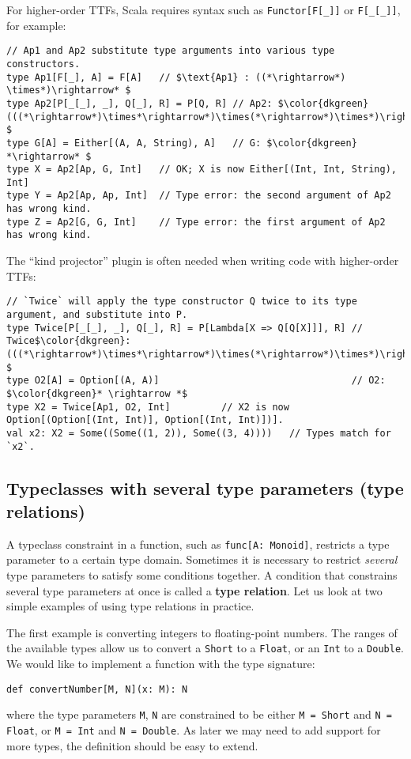 For higher-order TTFs, Scala requires syntax such as \lstinline!Functor[F[_]]!
or \lstinline!F[_[_]]!, for example:
\begin{lstlisting}[mathescape=true]
// Ap1 and Ap2 substitute type arguments into various type constructors.
type Ap1[F[_], A] = F[A]   // $\text{Ap1} : ((*\rightarrow*) \times*)\rightarrow* $
type Ap2[P[_[_], _], Q[_], R] = P[Q, R] // Ap2: $\color{dkgreen}(((*\rightarrow*)\times*\rightarrow*)\times(*\rightarrow*)\times*)\rightarrow* $
type G[A] = Either[(A, A, String), A]   // G: $\color{dkgreen} *\rightarrow* $
type X = Ap2[Ap, G, Int]   // OK; X is now Either[(Int, Int, String), Int]
type Y = Ap2[Ap, Ap, Int]  // Type error: the second argument of Ap2 has wrong kind.
type Z = Ap2[G, G, Int]    // Type error: the first argument of Ap2 has wrong kind.
\end{lstlisting}
The \textsf{``}kind projector\textsf{''} plugin is often needed when writing code
with higher-order TTFs:
\begin{lstlisting}[mathescape=true]
// `Twice` will apply the type constructor Q twice to its type argument, and substitute into P.
type Twice[P[_[_], _], Q[_], R] = P[Lambda[X => Q[Q[X]]], R] // Twice$\color{dkgreen}:(((*\rightarrow*)\times*\rightarrow*)\times(*\rightarrow*)\times*)\rightarrow* $
type O2[A] = Option[(A, A)]                                  // O2: $\color{dkgreen}* \rightarrow *$
type X2 = Twice[Ap1, O2, Int]         // X2 is now Option[(Option[(Int, Int)], Option[(Int, Int)])].
val x2: X2 = Some((Some((1, 2)), Some((3, 4))))   // Types match for `x2`.
\end{lstlisting}


\subsection{Typeclasses with several type parameters (type relations)\label{subsec:Typeclasses-type-relations}}

A typeclass constraint in a function, such as \lstinline!func[A: Monoid]!,
restricts a type parameter to a certain type domain. Sometimes it
is necessary to restrict \emph{several} type parameters to satisfy
some conditions together. A condition that constrains several type
parameters at once is called a \textbf{type
relation}. Let us look at two simple examples of using type relations
in practice. 

The first example is converting integers to floating-point numbers.
The ranges of the available types allow us to convert a \lstinline!Short!
to a \lstinline!Float!, or an \lstinline!Int! to a \lstinline!Double!.
We would like to implement a function with the type signature:
\begin{lstlisting}
def convertNumber[M, N](x: M): N
\end{lstlisting}
where the type parameters \lstinline!M!, \lstinline!N! are constrained
to be either \lstinline!M = Short! and \lstinline!N = Float!, or
\lstinline!M = Int! and \lstinline!N = Double!. As later we may
need to add support for more types, the definition should be easy
to extend.

